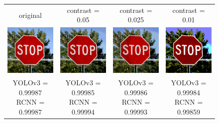 \documentclass{article}
\begin{document}
\begin{figure}[h]
\centering
\begin{tabular}{ c c c c }
    original & contrast = 0.05 & contrast = 0.025 & contrast = 0.01 \\
    \includegraphics[width=0.2\linewidth]{../test_images/stop.png} & \includegraphics[width=0.2\linewidth]{../test_images/perturbed/stop_contrast_0_050.png} & \includegraphics[width=0.2\linewidth]{../test_images/perturbed/stop_contrast_0_025.png} & \includegraphics[width=0.2\linewidth]{../test_images/perturbed/stop_contrast_0_010.png} \\
    \makecell{YOLOv3 = 0.99987 \\ RCNN = 0.99987} & \makecell{YOLOv3 = 0.99985 \\ RCNN = 0.99994} & \makecell{YOLOv3 = 0.99986 \\ RCNN = 0.99993} & \makecell{YOLOv3 = 0.99984 \\ RCNN = 0.99859} \\[1cm]

\end{tabular}
\end{figure}
\end{document}

